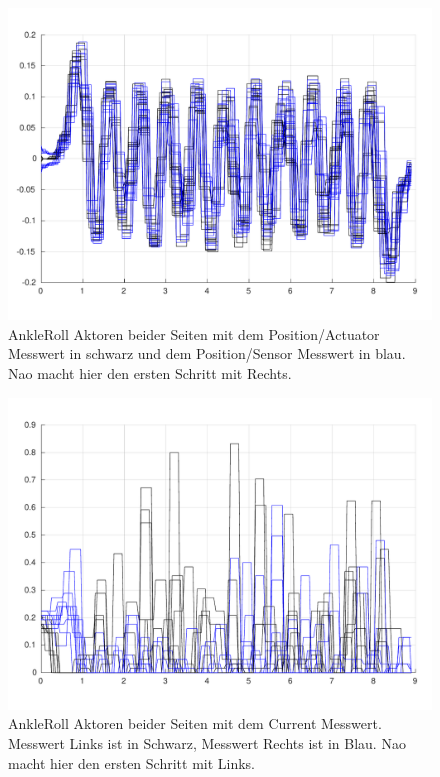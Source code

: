 \begin{figure}[tb]
	\centering
	\includegraphics[width=1\linewidth]{Bilder/AnkleRoll_beide_act_sens_rechts_anfang.pdf}
	\caption{AnkleRoll Aktoren beider Seiten mit dem Position/Actuator Messwert in schwarz und dem Position/Sensor Messwert in blau. Nao macht hier den ersten Schritt mit Rechts.}
	\label{AnkleRoll_beide_act_sens_rechts_anfang}
\end{figure}
\begin{figure}[tb]
	\centering
	\includegraphics[width=1\linewidth]{Bilder/AnkleRoll_beide_current_links_anfang.pdf}
	\caption{AnkleRoll Aktoren beider Seiten mit dem Current Messwert. Messwert Links ist in Schwarz, Messwert Rechts ist in Blau. Nao macht hier den ersten Schritt mit Links.}
	\label{AnkleRoll_beide_current_links_anfang}
\end{figure}
